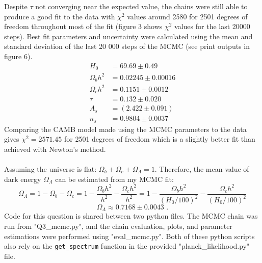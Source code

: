 \documentclass{article}
\newcommand{\<}[1]{\left\langle #1 \right\rangle }
\begin{document}
Despite $\tau$ not converging near the expected value, the chains were still able to produce a good fit to the data with $\chi^2$ values around 2580 for 2501 degrees of freedom throughout most of the fit (figure 3 shows $\chi^2$ values for the last 20000 steps). Best fit parameters and uncertainty were calculated using the mean and standard deviation of the last 20 000 steps of the MCMC (see print outputs in figure 6).
\begin{align*}
	H_0 &= 69.69 \pm 0.49  \\
	\Omega_b h^2 &= 0.02245 \pm 0.00016 \\
	\Omega_c h^2 &= 0.1151 \pm 0.0012 \\
	\tau &= 0.132 \pm 0.020 \\
	A_s &=  (2.422 \pm 0.091)\\
	n_s &=  0.9804 \pm 0.0037
\end{align*}
Comparing the CAMB model made using the MCMC parameters to the data gives $\chi^2 = 2571.45$ for 2501 degrees of freedom which is a slightly better fit than achieved with Newton's method.\\
\\
Assuming the universe is flat: $\Omega_b + \Omega_c + \Omega_\Lambda=1$. Therefore, the mean value of dark energy $\Omega_\Lambda$ can be estimated from my MCMC fit:
\[\Omega_\Lambda = 1 - \Omega_b - \Omega_c = 1 - \frac{\Omega_b h^2}{h^2} - \frac{\Omega_c h^2}{h^2} = 1 - \frac{\Omega_b h^2}{(H_0/100)^2} - \frac{\Omega_c h^2}{(H_0/100)^2} \]
\[\Omega_\Lambda \approx 0.7168 \pm 0.0043 \text{ .}\]
Code for this question is shared between two python files. The MCMC chain was run from "Q3\_mcmc.py", and the chain evaluation, plots, and parameter estimations were performed using "eval\_mcmc.py". Both of these python scripts also rely on the \texttt{get\_spectrum} function in the provided "planck\_likelihood.py" file.
\end{document}
